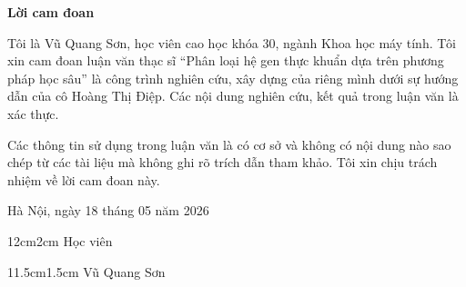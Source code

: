 \setcounter{page}{1}
\begin{center}
\textbf{\large{Lời cam đoan}	}
\end{center}
Tôi là Vũ Quang Sơn, học viên cao học khóa 30, ngành Khoa học máy tính. Tôi xin cam đoan luận văn thạc sĩ “Phân loại hệ gen thực khuẩn dựa trên phương pháp học sâu” là công trình nghiên cứu, xây dựng của riêng mình dưới sự hướng dẫn của cô Hoàng Thị Điệp. Các nội dung nghiên cứu, kết quả trong luận văn là xác thực.

Các thông tin sử dụng trong luận văn là có cơ sở và không có nội dung nào sao chép từ các tài liệu mà không ghi rõ trích dẫn tham khảo. Tôi xin chịu trách nhiệm về lời cam đoan này.

\begin{flushright}
Hà Nội, ngày 18 tháng 05 năm 2026
\end{flushright}

\begin{changemargin}{12cm}{2cm}
Học viên
\\[2cm]
\end{changemargin}

\begin{changemargin}{11.5cm}{1.5cm}
Vũ Quang Sơn
\end{changemargin}